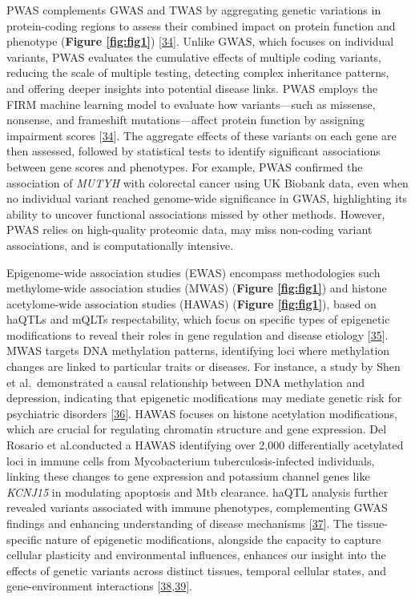PWAS complements GWAS and TWAS by aggregating genetic variations in protein-coding regions to assess their combined impact on protein function and phenotype (\textbf{Figure \ref{fig:fig1}}) {[}\protect\hyperlink{ref-1Dsj6bEd3}{34}{]}.
Unlike GWAS, which focuses on individual variants, PWAS evaluates the cumulative effects of multiple coding variants, reducing the scale of multiple testing, detecting complex inheritance patterns, and offering deeper insights into potential disease links.
PWAS employs the FIRM machine learning model to evaluate how variants---such as missense, nonsense, and frameshift mutations---affect protein function by assigning impairment scores {[}\protect\hyperlink{ref-1Dsj6bEd3}{34}{]}.
The aggregate effects of these variants on each gene are then assessed, followed by statistical tests to identify significant associations between gene scores and phenotypes.
For example, PWAS confirmed the association of \emph{MUTYH} with colorectal cancer using UK Biobank data, even when no individual variant reached genome-wide significance in GWAS, highlighting its ability to uncover functional associations missed by other methods.
However, PWAS relies on high-quality proteomic data, may miss non-coding variant associations, and is computationally intensive.

Epigenome-wide association studies (EWAS) encompass methodologies such methylome-wide association studies (MWAS) (\textbf{Figure \ref{fig:fig1}}) and histone acetylome-wide association studies (HAWAS) (\textbf{Figure \ref{fig:fig1}}), based on haQTLs and mQLTs respectability, which focus on specific types of epigenetic modifications to reveal their roles in gene regulation and disease etiology {[}\protect\hyperlink{ref-TPqvAJda}{35}{]}.
MWAS targets DNA methylation patterns, identifying loci where methylation changes are linked to particular traits or diseases.
For instance, a study by Shen et al.~demonstrated a causal relationship between DNA methylation and depression, indicating that epigenetic modifications may mediate genetic risk for psychiatric disorders {[}\protect\hyperlink{ref-1DNxNkLsT}{36}{]}.
HAWAS focuses on histone acetylation modifications, which are crucial for regulating chromatin structure and gene expression.
Del Rosario et al.conducted a HAWAS identifying over 2,000 differentially acetylated loci in immune cells from Mycobacterium tuberculosis-infected individuals, linking these changes to gene expression and potassium channel genes like \emph{KCNJ15} in modulating apoptosis and Mtb clearance.
haQTL analysis further revealed variants associated with immune phenotypes, complementing GWAS findings and enhancing understanding of disease mechanisms {[}\protect\hyperlink{ref-1BYHeZlgB}{37}{]}.
The tissue-specific nature of epigenetic modifications, alongside the capacity to capture cellular plasticity and environmental influences, enhances our insight into the effects of genetic variants across distinct tissues, temporal cellular states, and gene-environment interactions {[}\protect\hyperlink{ref-FeaSnwhX}{38},\protect\hyperlink{ref-KfWCLspO}{39}{]}.

